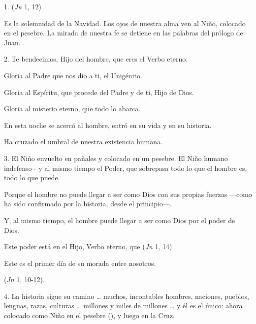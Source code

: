 				\begin{body}
					1.  (\emph{Jn} 1, 12)
					
					Es la solemnidad de la Navidad. Los ojos de nuestra alma ven al Niño, colocado en el pesebre. La mirada de nuestra fe se detiene en las palabras del prólogo de Juan. .
					
					2. Te bendecimos, Hijo del hombre, que eres el Verbo eterno.
					
					Gloria al Padre que nos dio a ti, el Unigénito.
					
					Gloria al Espíritu, que procede del Padre y de ti, Hijo de Dios.
					
					Gloria al misterio eterno, que todo lo abarca.
					
					En esta noche se acercó al hombre, entró en su vida y en su historia.
					
					Ha cruzado el umbral de nuestra existencia humana.
					
					3. El Niño envuelto en pañales y colocado en un pesebre. El Niño humano indefenso - y al mismo tiempo el Poder, que sobrepasa todo lo que el hombre es, todo lo que puede.
					
					Porque el hombre no puede llegar a ser como Dios con sus propias fuerzas ---como ha sido confirmado por la historia, desde el principio---.
					
					Y, al mismo tiempo, el hombre puede llegar a ser como Dios por el poder de Dios.
					
					Este poder está en el Hijo, Verbo eterno, que  (\emph{Jn} 1, 14).
					
					Este es el primer día de su morada entre nosotros.
					
					 (\emph{Jn} 1, 10-12).
					
					4. La historia sigue su camino \ldots{} muchos, incontables hombres, naciones, pueblos, lenguas, razas, culturas \ldots{} millones y miles de millones \ldots{} y él es el único: ahora colocado como Niño en el pesebre (), y luego en la Cruz.
					

\end{body}
